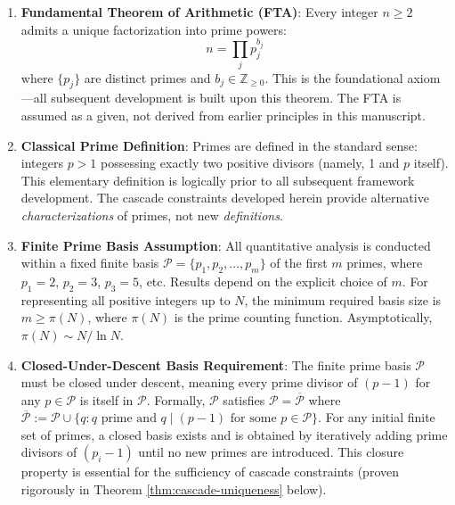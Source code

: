 \begin{enumerate}

\item \textbf{Fundamental Theorem of Arithmetic (FTA)}: Every integer $n \geq 2$ admits a unique factorization into prime powers:
\begin{equation}
n = \prod_j p_j^{b_j}
\end{equation}
where $\{p_j\}$ are distinct primes and $b_j \in \mathbb{Z}_{\geq 0}$. This is the foundational axiom—all subsequent development is built upon this theorem. The FTA is assumed as a given, not derived from earlier principles in this manuscript.

\item \textbf{Classical Prime Definition}: Primes are defined in the standard sense: integers $p > 1$ possessing exactly two positive divisors (namely, 1 and $p$ itself). This elementary definition is logically prior to all subsequent framework development. The cascade constraints developed herein provide alternative \textit{characterizations} of primes, not new \textit{definitions}.

\item \textbf{Finite Prime Basis Assumption}: All quantitative analysis is conducted within a fixed finite basis $\mathcal{P} = \{p_1, p_2, \ldots, p_m\}$ of the first $m$ primes, where $p_1 = 2$, $p_2 = 3$, $p_3 = 5$, etc. Results depend on the explicit choice of $m$. For representing all positive integers up to $N$, the minimum required basis size is $m \geq \pi(N)$, where $\pi(N)$ is the prime counting function. Asymptotically, $\pi(N) \sim N / \ln N$.

\item \textbf{Closed-Under-Descent Basis Requirement}: The finite prime basis $\mathcal{P}$ must be closed under descent, meaning every prime divisor of $(p - 1)$ for any $p \in \mathcal{P}$ is itself in $\mathcal{P}$. Formally, $\mathcal{P}$ satisfies $\mathcal{P} = \overline{\mathcal{P}}$ where $\overline{\mathcal{P}} := \mathcal{P} \cup \{q : q \text{ prime and } q \mid (p - 1) \text{ for some } p \in \mathcal{P}\}$. For any initial finite set of primes, a closed basis exists and is obtained by iteratively adding prime divisors of $(p_i - 1)$ until no new primes are introduced. This closure property is essential for the sufficiency of cascade constraints (proven rigorously in Theorem \ref{thm:cascade-uniqueness} below).


\end{enumerate}
